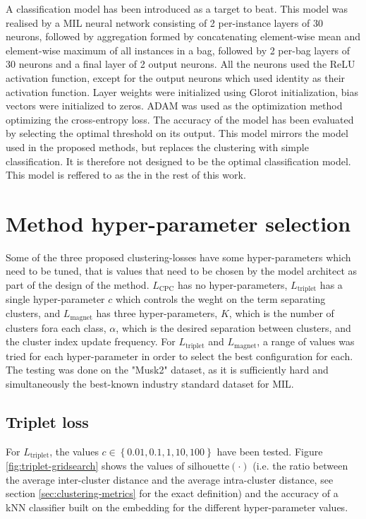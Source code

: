 A classification model has been introduced as a target to beat. This model was realised by a MIL neural network consisting of 2 per-instance layers of 30 neurons, followed by aggregation formed by concatenating element-wise mean and element-wise maximum of all instances in a bag, followed by 2 per-bag layers of 30 neurons and a final layer of 2 output neurons. All the neurons used the ReLU activation function, except for the output neurons which used identity as their activation function. Layer weights were initialized using Glorot initialization, bias vectors were initialized to zeros. ADAM was used as the optimization method optimizing the cross-entropy loss. The accuracy of the model has been evaluated by selecting the optimal threshold on its output. This model mirrors the model used in the proposed methods, but replaces the clustering with simple classification. It is therefore not designed to be the optimal classification model. This model is reffered to as the  in the rest of this work.

\section{Method hyper-parameter selection}

Some of the three proposed clustering-losses have some hyper-parameters which need to be tuned, that is values that need to be chosen by the model architect as part of the design of the method. \( L_\mathrm{CPC} \) has no hyper-parameters, \( L_\mathrm{triplet} \) has a single hyper-parameter \( c \) which controls the weght on the term separating clusters, and \( L_\mathrm{magnet} \) has three hyper-parameters, \( K \), which is the number of clusters fora each class, \( \alpha \), which is the desired separation between clusters, and the cluster index update frequency. For \( L_\mathrm{triplet} \) and \( L_\mathrm{magnet} \), a range of values was tried for each hyper-parameter in order to select the best configuration for each. The testing was done on the "Musk2" dataset, as it is sufficiently hard and simultaneously the best-known industry standard dataset for MIL.

\subsection{Triplet loss}
For \( L_\mathrm{triplet} \), the values \( c \in \left\{ 0.01, 0.1, 1, 10, 100 \right\} \) have been tested. Figure \ref{fig:triplet-gridsearch} shows the values of \( \mathrm{silhouette} \left( \cdot \right) \) (i.e. the ratio between the average inter-cluster distance and the average intra-cluster distance, see section \ref{sec:clustering-metrics} for the exact definition) and the accuracy of a kNN classifier built on the embedding for the different hyper-parameter values.

